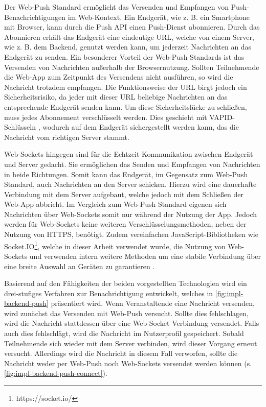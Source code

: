 Der Web-Push Standard ermöglicht das Versenden und Empfangen von
Push-Benach\-richti\-gungen im Web-Kontext. Ein Endgerät, wie z. B. ein Smartphone
mit Browser, kann durch die Push API einen Push-Dienst abonnieren. Durch das
Abonnieren erhält das Endgerät eine eindeutige URL, welche von einem Server, wie
z. B. dem Backend, genutzt werden kann, um jederzeit Nachrichten an das Endgerät
zu senden. Ein besonderer Vorteil der Web-Push Standards ist das Versenden von
Nachrichten außerhalb der Browsernutzung. Sollten Teilnehmende die Web-App zum
Zeitpunkt des Versendens nicht ausführen, so wird die Nachricht trotzdem
empfangen. Die Funktionsweise der URL birgt jedoch ein Sicherheitsrisiko, da
jeder mit dieser URL beliebige Nachrichten an das entsprechende Endgerät senden
kann. Um diese Sicherheitslücke zu schließen, muss jedes Abonnement
verschlüsselt werden. Dies geschieht mit VAPID-Schlüsseln \cite{VAPID}, wodurch
auf dem Endgerät sichergestellt werden kann, das die Nachricht vom richtigen
Server stammt.

Web-Sockets hingegen sind für die Echtzeit-Kommunikation zwischen Endgerät und
Server gedacht. Sie ermöglichen das Senden und Empfangen von Nachrichten in
beide Richtungen. Somit kann das Endgerät, im Gegensatz zum Web-Push Standard,
auch Nachrichten an den Server schicken. Hierzu wird eine dauerhafte Verbindung
mit dem Server aufgebaut, welche jedoch mit dem Schließen der Web-App abbricht.
Im Vergleich zum Web-Push Standard eigenen sich Nachrichten über Web-Sockets
somit nur während der Nutzung der App. Jedoch werden für Web-Sockets keine
weiteren Verschlüsselungsmethoden, neben der Nutzung von HTTPS, benötigt. Zudem
vereinfachen JavaScript-Bibliotheken wie Socket.IO\footnote{https://socket.io/},
welche in dieser Arbeit verwendet wurde, die Nutzung von Web-Sockets und
verwenden intern weitere Methoden um eine stabile Verbindung über eine
breite Auswahl an Geräten zu garantieren \cite{SocketIO2022}.


Basierend auf den Fähigkeiten der beiden vorgestellten Technologien wird ein
drei-stufiges Verfahren zur Benachrichtigung entwickelt, welches in
\autoref{fig:impl-backend-push} präsentiert wird. Wenn Veranstaltende eine
Nachricht versenden, wird zunächst das Versenden mit Web-Push versucht. Sollte
dies fehlschlagen, wird die Nachricht stattdessen über eine Web-Socket
Verbindung versendet. Falls auch dies fehlschlägt, wird die Nachricht im
Nutzerprofil gespeichert. Sobald Teilnehmende sich wieder mit dem Server
verbinden, wird dieser Vorgang erneut versucht. Allerdings wird die Nachricht in
diesem Fall verworfen, sollte die Nachricht weder per Web-Push noch Web-Sockets
versendet werden können (s. \autoref{fig:impl-backend-push-connect}).

